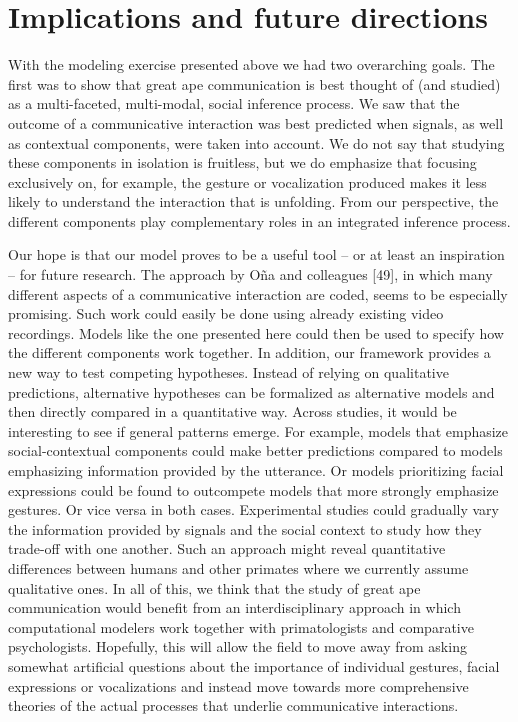 \documentclass[
  man,floatsintext]{apa6}
\begin{document}
\hypertarget{implications-and-future-directions}{%
\section{Implications and future directions}\label{implications-and-future-directions}}

With the modeling exercise presented above we had two overarching goals. The first was to show that great ape communication is best thought of (and studied) as a multi-faceted, multi-modal, social inference process. We saw that the outcome of a communicative interaction was best predicted when signals, as well as contextual components, were taken into account. We do not say that studying these components in isolation is fruitless, but we do emphasize that focusing exclusively on, for example, the gesture or vocalization produced makes it less likely to understand the interaction that is unfolding. From our perspective, the different components play complementary roles in an integrated inference process.

Our hope is that our model proves to be a useful tool -- or at least an inspiration -- for future research. The approach by Oña and colleagues {[}49{]}, in which many different aspects of a communicative interaction are coded, seems to be especially promising. Such work could easily be done using already existing video recordings. Models like the one presented here could then be used to specify how the different components work together. In addition, our framework provides a new way to test competing hypotheses. Instead of relying on qualitative predictions, alternative hypotheses can be formalized as alternative models and then directly compared in a quantitative way. Across studies, it would be interesting to see if general patterns emerge. For example, models that emphasize social-contextual components could make better predictions compared to models emphasizing information provided by the utterance. Or models prioritizing facial expressions could be found to outcompete models that more strongly emphasize gestures. Or vice versa in both cases. Experimental studies could gradually vary the information provided by signals and the social context to study how they trade-off with one another. Such an approach might reveal quantitative differences between humans and other primates where we currently assume qualitative ones. In all of this, we think that the study of great ape communication would benefit from an interdisciplinary approach in which computational modelers work together with primatologists and comparative psychologists. Hopefully, this will allow the field to move away from asking somewhat artificial questions about the importance of individual gestures, facial expressions or vocalizations and instead move towards more comprehensive theories of the actual processes that underlie communicative interactions.
\end{document}
